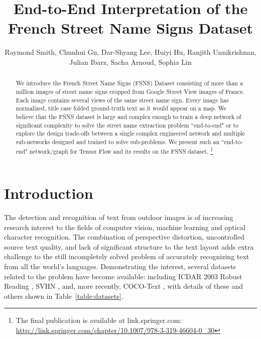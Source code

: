 \documentclass[runningheads]{llncs}
\begin{document}
\pagestyle{headings}
\setlength\extrarowheight{4pt}
\setlength{\tabcolsep}{4pt}
\renewcommand{\floatpagefraction}{.8}

\mainmatter

\title{End-to-End Interpretation of the French Street Name Signs Dataset}



\author{Raymond Smith, Chunhui Gu, Dar-Shyang Lee, Huiyi Hu, Ranjith Unnikrishnan, Julian Ibarz, Sacha Arnoud, Sophia Lin}





\maketitle

\begin{abstract}
We introduce the French Street Name Signs (FSNS) Dataset consisting of more than a million images of
 street name signs cropped from Google Street View images of France. Each image contains several views
 of the same street name sign. Every image has normalized, title case folded ground-truth text as it would
 appear on a map. 
 We believe that the FSNS dataset is large and complex enough to train a deep network of significant
 complexity to solve the street name extraction problem ``end-to-end" or to explore the design trade-offs
 between a single complex engineered network and multiple sub-networks designed and trained to solve
 sub-problems. We present such an ``end-to-end" network/graph for Tensor Flow and its results on the
 FSNS dataset.
\footnote{The final publication is available at link.springer.com:
\url{http://link.springer.com/chapter/10.1007/978-3-319-46604-0_30}}
\end{abstract}

\section{Introduction}

The detection and recognition of text from outdoor images is of increasing research interest to the fields
 of computer vision, machine learning and optical character recognition. The combination of perspective
 distortion, uncontrolled source text quality, and lack of significant structure to the text layout adds
 extra challenge to the still incompletely solved problem of accurately recognizing text from all the
 world's languages. Demonstrating the interest, several datasets related to the problem have become
 available: including ICDAR 2003 Robust Reading \cite{lucas2005icdar}, SVHN \cite{netzer2011reading},
 and, more recently, COCO-Text \cite{veit2016coco}, with details of these and others shown in
 Table~\ref{table:datasets}.
\end{document}
